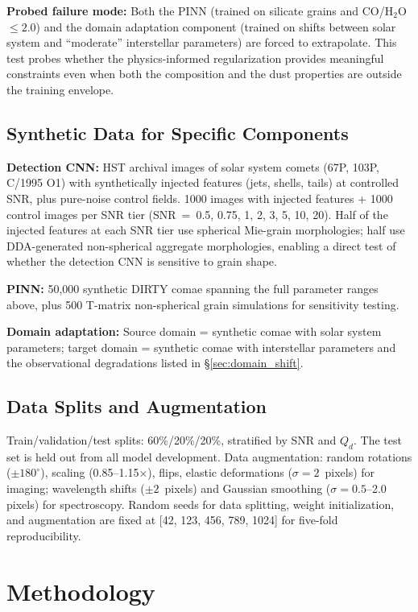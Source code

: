 \documentclass[preprint2]{aastex631}
\begin{document}
\textbf{Probed failure mode:} Both the PINN (trained on silicate grains and CO/H$_2$O $\leq 2.0$) and the domain adaptation component (trained on shifts between solar system and ``moderate'' interstellar parameters) are forced to extrapolate. This test probes whether the physics-informed regularization provides meaningful constraints even when both the composition and the dust properties are outside the training envelope.

\subsection{Synthetic Data for Specific Components}

\textbf{Detection CNN:} HST archival images of solar system comets (67P, 103P, C/1995 O1) with synthetically injected features (jets, shells, tails) at controlled SNR, plus pure-noise control fields. 1000 images with injected features + 1000 control images per SNR tier (SNR~=~0.5, 0.75, 1, 2, 3, 5, 10, 20). Half of the injected features at each SNR tier use spherical Mie-grain morphologies; half use DDA-generated non-spherical aggregate morphologies, enabling a direct test of whether the detection CNN is sensitive to grain shape.

\textbf{PINN:} 50,000 synthetic DIRTY comae spanning the full parameter ranges above, plus 500 T-matrix non-spherical grain simulations for sensitivity testing.

\textbf{Domain adaptation:} Source domain = synthetic comae with solar system parameters; target domain = synthetic comae with interstellar parameters and the observational degradations listed in \S\ref{sec:domain_shift}.

\subsection{Data Splits and Augmentation}

Train/validation/test splits: 60\%/20\%/20\%, stratified by SNR and $Q_d$. The test set is held out from all model development. Data augmentation: random rotations ($\pm 180^\circ$), scaling (0.85--1.15$\times$), flips, elastic deformations ($\sigma = 2$~pixels) for imaging; wavelength shifts ($\pm 2$~pixels) and Gaussian smoothing ($\sigma = 0.5$--2.0 pixels) for spectroscopy. Random seeds for data splitting, weight initialization, and augmentation are fixed at [42, 123, 456, 789, 1024] for five-fold reproducibility.

\section{Methodology}\label{sec:methods}
\end{document}
